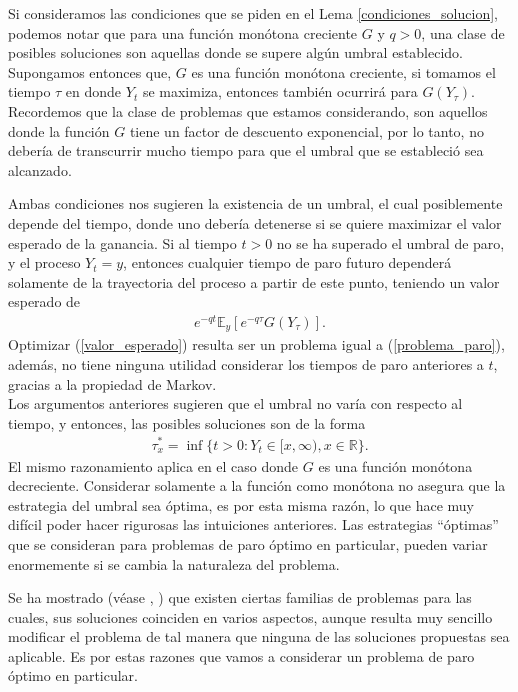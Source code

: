Si consideramos las condiciones que se piden en el Lema \ref{condiciones_solucion}, podemos notar que para una función monótona creciente $G$ y $q > 0$, una clase de posibles soluciones son aquellas donde se supere algún umbral establecido. \\

Supongamos entonces que, $G$ es una función monótona creciente, si tomamos el tiempo $\tau$ en donde $Y_t$ se maximiza, entonces también ocurrirá para $G(Y_{\tau})$. Recordemos que la clase de problemas que estamos considerando, son aquellos donde la función $G$ tiene un factor de descuento exponencial, por lo tanto, no debería de transcurrir mucho tiempo para que el umbral que se estableció sea alcanzado. 

Ambas condiciones nos sugieren la existencia de un umbral, el cual posiblemente depende del tiempo, donde uno debería detenerse si se quiere maximizar el valor esperado de la ganancia. Si al tiempo $t > 0$ no se ha superado el umbral de paro, y el proceso $Y_t = y$, entonces cualquier tiempo de paro futuro dependerá solamente de la trayectoria del proceso a partir de este punto, teniendo un valor esperado de 
\begin{align}
	e^{-qt} \mathbb{E}_y \left[ e^{-q \tau} G(Y_{\tau}) \right]. \label{valor_esperado}
\end{align}
Optimizar (\ref{valor_esperado}) resulta ser un problema igual a (\ref{problema_paro}), además, no tiene ninguna utilidad considerar los tiempos de paro anteriores a $t$, gracias a la propiedad de Markov. \\

Los argumentos anteriores sugieren que el umbral no varía con respecto al tiempo, y entonces, las posibles soluciones son de la forma
\begin{align*}
	\tau_x^{*} = \inf \{ t > 0 : Y_t \in [x, \infty), x \in \mathbb{R} \}.
\end{align*}
El mismo razonamiento aplica en el caso donde $G$ es una función monótona decreciente. Considerar solamente a la función como monótona no asegura que la estrategia del umbral sea óptima, es por esta misma razón, lo que hace muy difícil poder hacer rigurosas las intuiciones anteriores. Las estrategias ``óptimas'' que se consideran para problemas de paro óptimo en particular, pueden variar enormemente si se cambia la naturaleza del problema. 

Se ha mostrado (véase \cite{avram}, \cite{kyprianou2}) que existen ciertas familias de problemas para las cuales, sus soluciones coinciden en varios aspectos, aunque resulta muy sencillo modificar el problema de tal manera que ninguna de las soluciones propuestas sea aplicable. Es por estas razones que vamos a considerar un problema de paro óptimo en particular. 

